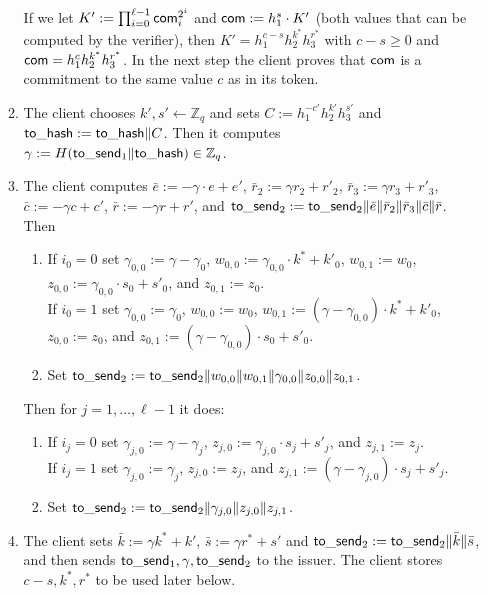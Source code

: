 \documentclass[11pt]{article}
\def\com{{\sf com}}
\def\send{{\sf to}\mbox{\_}{\sf send}}
\def\hash{{\sf to}\mbox{\_}{\sf hash}}
\def\Z{{\mathbb Z}}
\def\Z{{\mathbb Z}}
\begin{document}
\begin{itemize}
\begin{enumerate}
         \medskip{} If we let $K':=\prod_{i=0}^{\ell-1} \com_i^{2^i}$ and $\com:=h_1^s\cdot K'$ (both values that can be computed by the verifier), then $K'=h_1^{c-s} h_2^{k^*} h_3^{r^*}$ with $c-s\geq 0$ and $\com=h_1^c h_2^{k^*} h_3^{r^*}$. In the next step the client proves that $\com$ is a commitment to the same value $c$ as in its token.
        
    \item The client chooses $k', s'\leftarrow \Z_q$ and sets $C:=h_1^{-c'}h_2^{k'} h_3^{s'}$ and $\hash:=\hash\|C$. Then it computes $\gamma := H(\send_1\|\hash) \in \Z_q$.
    
        \item The client computes $\bar e := -\gamma \cdot e + e'$, $\bar r_2 := \gamma r_2 + r'_2$, $\bar r_3:=\gamma r_3 + r'_3$, $\bar c:=-\gamma c+c'$, $\bar r:=-\gamma r + r'$, and $\send_2:=\send_2\|\bar e\| \bar r_2 \| \bar r_3 \| \bar c \| \bar r$. 
        Then
  \begin{enumerate}
    \item If $i_0=0$ set $\gamma_{0,0}:=\gamma-\gamma_0$, $w_{0,0}:=\gamma_{0,0} \cdot k^*+k'_0$, 
    $w_{0,1}:=w_0$,
    $z_{0,0}:=\gamma_{0,0}\cdot s_0+s'_0$, and $z_{0,1}:=z_0$.\\
    If $i_0=1$ set $\gamma_{0,0}:=\gamma_0$, $w_{0,0}:=w_0$, $w_{0,1}:= (\gamma-\gamma_{0,0}) \cdot k^*+k'_0$,
    $z_{0,0}:=z_0$, and $z_{0,1}:=(\gamma-\gamma_{0,0}) \cdot s_0+s'_0$. 
    \item Set $\send_2:=\send_2\|w_{0,0}\|w_{0,1}\|\gamma_{0,0}\|z_{0,0}\|z_{0,1}$.
\end{enumerate}      
        Then for $j=1, \ldots, \ell-1$ it does:
\begin{enumerate}
    \item If $i_j=0$ set $\gamma_{j,0}:=\gamma-\gamma_j$, $z_{j,0}:=\gamma_{j,0}\cdot s_j+s'_j$, and $z_{j,1}:=z_j$.\\
    If $i_j=1$ set $\gamma_{j,0}:=\gamma_j$, %
    $z_{j,0}:=z_j$, and $z_{j,1}:=(\gamma-\gamma_{j,0}) \cdot s_j+s'_j$. 
    \item Set $\send_2:=\send_2\|\gamma_{j,0}\|z_{j,0}\|z_{j,1}$.
\end{enumerate}
\item The client sets $\bar k:= \gamma k^* + k'$, $\bar s := \gamma r^* + s'$ and $\send_2:=\send_2\|\bar k\|\bar s$, and then sends $\send_1, \gamma, \send_2$ to the issuer.
The client stores $c-s, k^*, r^*$ to be used later below.



\end{enumerate}
\end{itemize}
\end{document}
